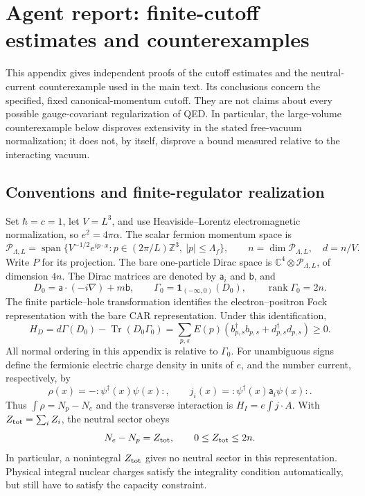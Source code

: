 \section{Agent report: finite-cutoff estimates and counterexamples}
\label{app-finite:report}

This appendix gives independent proofs of the cutoff estimates and the
neutral-current counterexample used in the main text.  Its conclusions concern
the specified, fixed canonical-momentum cutoff.  They are not claims about every
possible gauge-covariant regularization of QED.  In particular, the large-volume
counterexample below disproves extensivity in the stated free-vacuum
normalization; it does not, by itself, disprove a bound measured relative to the
interacting vacuum.

\subsection{Conventions and finite-regulator realization}
\label{app-finite:conventions}

Set $\hbar=c=1$, let $V=L^3$, and use Heaviside--Lorentz electromagnetic
normalization, so $e^2=4\pi\alpha$.  The scalar fermion momentum space is
\[
 \mathcal P_{\Lambda,L}
 =\operatorname{span}\{V^{-1/2}e^{ip\cdot x}:
 p\in(2\pi/L)\mathbb Z^3,\ |p|\le\Lambda_f\},
 \qquad n=\dim\mathcal P_{\Lambda,L},\quad d=n/V.
\]
Write $P$ for its projection.  The bare one-particle Dirac space is
$\mathbb C^4\otimes\mathcal P_{\Lambda,L}$, of dimension $4n$.  The Dirac
matrices are denoted by $\mathsf a_i$ and $\mathsf b$, and
\[
 D_0=\mathsf a\cdot(-i\nabla)+m\mathsf b,
 \qquad \Gamma_0=\mathbf1_{(-\infty,0)}(D_0),
 \qquad \operatorname{rank}\Gamma_0=2n.
\]
The finite particle--hole transformation identifies the electron--positron
Fock representation with the bare CAR representation.  Under this
identification,
\[
 H_D=d\Gamma(D_0)-\operatorname{Tr}(D_0\Gamma_0)
     =\sum_{p,s}E(p)(b_{p,s}^\dagger b_{p,s}
                         +d_{p,s}^\dagger d_{p,s})\ge0.
\]
All normal ordering in this appendix is relative to $\Gamma_0$.
For unambiguous signs define the fermionic electric charge density in units of
$e$, and the number current, respectively, by
\[
 \rho(x)=-:\!\psi^\dagger(x)\psi(x)\!:,
 \qquad j_i(x)=:\!\psi^\dagger(x)\mathsf a_i\psi(x)\!:.
\]
Thus $\int\rho=N_p-N_e$ and the transverse interaction is
$H_I=e\int j\cdot A$.  With $Z_{\rm tot}=\sum_i Z_i$, the neutral sector obeys
\begin{equation}
 N_e-N_p=Z_{\rm tot},\qquad 0\le Z_{\rm tot}\le2n.
 \label{app-finite:capacity}
\end{equation}
In particular, a nonintegral $Z_{\rm tot}$ gives no neutral sector in this
representation.  Physical integral nuclear charges satisfy the integrality
condition automatically, but still have to satisfy the capacity constraint.

